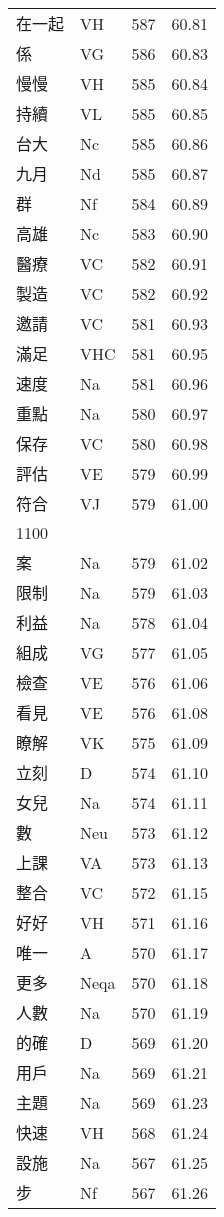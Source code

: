 \documentclass[twocolumn]{book}
\begin{document}
\begin{supertabular}{llrr}
在一起 & VH & 587 &  60.81\\
係 & VG & 586 &  60.83\\
慢慢 & VH & 585 &  60.84\\
持續 & VL & 585 &  60.85\\
台大 & Nc & 585 &  60.86\\
九月 & Nd & 585 &  60.87\\
群 & Nf & 584 &  60.89\\
高雄 & Nc & 583 &  60.90\\
醫療 & VC & 582 &  60.91\\
製造 & VC & 582 &  60.92\\
邀請 & VC & 581 &  60.93\\
滿足 & VHC & 581 &  60.95\\
速度 & Na & 581 &  60.96\\
重點 & Na & 580 &  60.97\\
保存 & VC & 580 &  60.98\\
評估 & VE & 579 &  60.99\\
符合 & VJ & 579 &  61.00\\
1100\\
案 & Na & 579 &  61.02\\
限制 & Na & 579 &  61.03\\
利益 & Na & 578 &  61.04\\
組成 & VG & 577 &  61.05\\
檢查 & VE & 576 &  61.06\\
看見 & VE & 576 &  61.08\\
瞭解 & VK & 575 &  61.09\\
立刻 & D & 574 &  61.10\\
女兒 & Na & 574 &  61.11\\
數 & Neu & 573 &  61.12\\
上課 & VA & 573 &  61.13\\
整合 & VC & 572 &  61.15\\
好好 & VH & 571 &  61.16\\
唯一 & A & 570 &  61.17\\
更多 & Neqa & 570 &  61.18\\
人數 & Na & 570 &  61.19\\
的確 & D & 569 &  61.20\\
用戶 & Na & 569 &  61.21\\
主題 & Na & 569 &  61.23\\
快速 & VH & 568 &  61.24\\
設施 & Na & 567 &  61.25\\
步 & Nf & 567 &  61.26\\

\end{supertabular}
\end{document}

